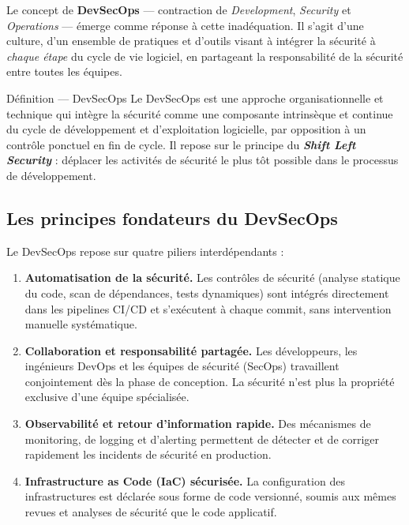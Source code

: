 Le concept de \textbf{DevSecOps} --- contraction de \textit{Development},
\textit{Security} et \textit{Operations} --- émerge comme réponse à cette
inadéquation. Il s'agit d'une culture, d'un ensemble de pratiques et d'outils
visant à intégrer la sécurité à \textit{chaque étape} du cycle de vie logiciel,
en partageant la responsabilité de la sécurité entre toutes les équipes.

\begin{definitionbox}{Définition --- DevSecOps}
  Le DevSecOps est une approche organisationnelle et technique qui intègre la
  sécurité comme une composante intrinsèque et continue du cycle de développement
  et d'exploitation logicielle, par opposition à un contrôle ponctuel en fin de
  cycle. Il repose sur le principe du \textbf{\textit{Shift Left Security}} :
  déplacer les activités de sécurité le plus tôt possible dans le processus
  de développement.
\end{definitionbox}

\subsection{Les principes fondateurs du DevSecOps}

Le DevSecOps repose sur quatre piliers interdépendants :

\begin{enumerate}
  \item \textbf{Automatisation de la sécurité.} Les contrôles de sécurité
    (analyse statique du code, scan de dépendances, tests dynamiques) sont
    intégrés directement dans les pipelines CI/CD et s'exécutent à chaque
    commit, sans intervention manuelle systématique.

  \item \textbf{Collaboration et responsabilité partagée.} Les développeurs,
    les ingénieurs DevOps et les équipes de sécurité (SecOps) travaillent
    conjointement dès la phase de conception. La sécurité n'est plus la
    propriété exclusive d'une équipe spécialisée.

  \item \textbf{Observabilité et retour d'information rapide.} Des mécanismes
    de monitoring, de logging et d'alerting permettent de détecter et de
    corriger rapidement les incidents de sécurité en production.

  \item \textbf{Infrastructure as Code (IaC) sécurisée.} La configuration des
    infrastructures est déclarée sous forme de code versionné, soumis aux mêmes
    revues et analyses de sécurité que le code applicatif.
\end{enumerate}

